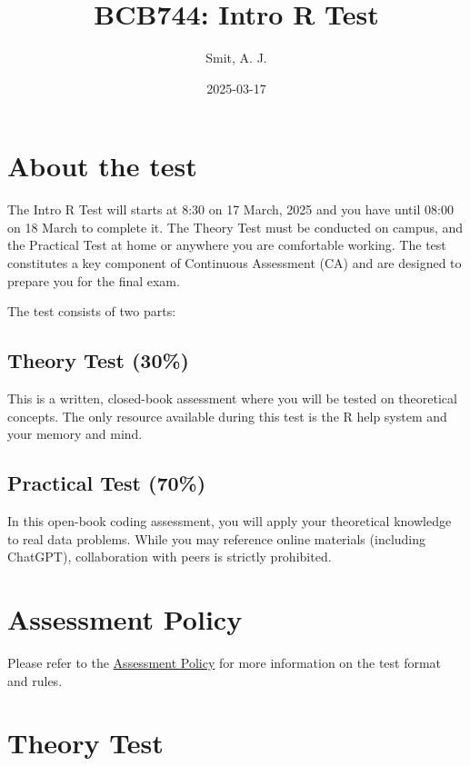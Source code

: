 \documentclass[
  10t,
]{article}
\title{BCB744: Intro R Test}
\author{Smit, A. J.}
\date{2025-03-17}
\begin{document}
\maketitle


\section{About the test}\label{about-the-test}

The Intro R Test will starts at 8:30 on 17 March, 2025 and you have
until 08:00 on 18 March to complete it. The Theory Test must be
conducted on campus, and the Practical Test at home or anywhere you are
comfortable working. The test constitutes a key component of Continuous
Assessment (CA) and are designed to prepare you for the final exam.

The test consists of two parts:

\subsection{Theory Test (30\%)}\label{theory-test-30}

This is a written, closed-book assessment where you will be tested on
theoretical concepts. The only resource available during this test is
the R help system and your memory and mind.

\subsection{Practical Test (70\%)}\label{practical-test-70}

In this open-book coding assessment, you will apply your theoretical
knowledge to real data problems. While you may reference online
materials (including ChatGPT), collaboration with peers is strictly
prohibited.

\section{Assessment Policy}\label{assessment-policy}

Please refer to the
\href{https://tangledbank.netlify.app/BCB744/BCB744_index.html\#sec-policy}{Assessment
Policy} for more information on the test format and rules.

\section{Theory Test}\label{theory-test}
\end{document}
